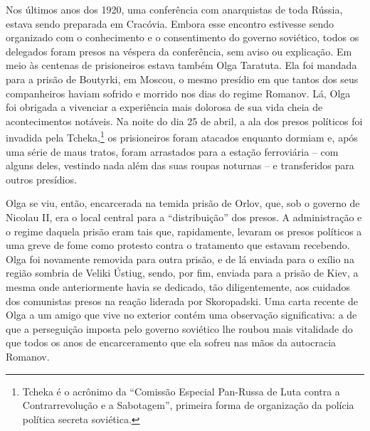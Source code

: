 Nos últimos anos dos 1920, uma conferência com anarquistas de toda
Rússia, estava sendo preparada em Cracóvia. Embora esse encontro
estivesse sendo organizado com o conhecimento e o consentimento do
governo soviético, todos os delegados foram presos na véspera da
conferência, sem aviso ou explicação. Em meio às centenas de
prisioneiros estava também Olga Taratuta. Ela foi mandada para a prisão
de Boutyrki, em Moscou, o mesmo presídio em que tantos dos seus
companheiros haviam sofrido e morrido nos dias do regime Romanov. Lá,
Olga foi obrigada a vivenciar a experiência mais dolorosa de sua vida
cheia de acontecimentos notáveis. Na noite do dia 25 de abril, a ala dos
presos políticos foi invadida pela Tcheka,\footnote{Tcheka é o acrônimo
  da ``Comissão Especial Pan-Russa de Luta contra a Contrarrevolução e a
  Sabotagem'', primeira forma de organização da polícia política secreta
  soviética.} os prisioneiros foram atacados enquanto dormiam e, após
uma série de maus tratos, foram arrastados para a estação ferroviária --
com alguns deles, vestindo nada além das suas roupas noturnas -- e
transferidos para outros presídios.

Olga se viu, então, encarcerada na temida prisão de Orlov, que, sob o
governo de Nicolau II, era o local central para a ``distribuição'' dos
presos. A administração e o regime daquela prisão eram tais que,
rapidamente, levaram os presos políticos a uma greve de fome como
protesto contra o tratamento que estavam recebendo. Olga foi novamente
removida para outra prisão, e de lá enviada para o exílio na região
sombria de Veliki Ústiug, sendo, por fim, enviada para a prisão de Kiev,
a mesma onde anteriormente havia se dedicado, tão diligentemente, aos
cuidados dos comunistas presos na reação liderada por Skoropadski. Uma
carta recente de Olga a um amigo que vive no exterior contém uma
observação significativa: a de que a perseguição imposta pelo governo
soviético lhe roubou mais vitalidade do que todos os anos de
encarceramento que ela sofreu nas mãos da autocracia Romanov.

